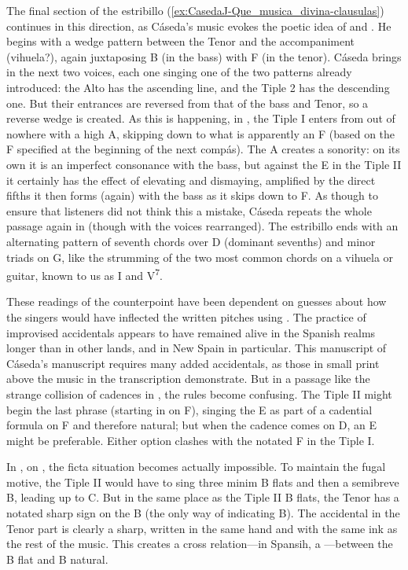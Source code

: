 The final section of the estribillo (\cref{ex:CasedaJ-Que_musica_divina-clausulas}) continues in this direction, as Cáseda's music evokes the poetic idea of  and .
He begins with a wedge pattern between the Tenor and the accompaniment (vihuela?), again juxtaposing B\fl{} (in the bass) with F\sh{} (in the tenor).
Cáseda brings in the next two voices, each one singing one of the two patterns already introduced: the Alto has the ascending line, and the Tiple 2 has the descending one.
But their entrances are reversed from that of the bass and Tenor, so a reverse wedge is created.
As this is happening, in , the Tiple I enters from out of nowhere with a high A, skipping down to what is apparently an F\na{} (based on the F\sh{} specified at the beginning of the next compás).
The A creates a  sonority: on its own it is an imperfect consonance with the bass, but against the E\fl{} in the Tiple II it certainly has the effect of elevating and dismaying, amplified by the direct fifths it then forms (again) with the bass as it skips down to F.
As though to ensure that listeners did not think this a mistake, Cáseda repeats the whole passage again in  (though with the voices rearranged).
The estribillo ends with an alternating pattern of seventh chords over D (dominant sevenths) and minor triads on G, like the strumming of the two most common chords on a vihuela or guitar, known to us as I and V\textsuperscript{7}.

These readings of the counterpoint have been dependent on guesses about how the singers would have inflected the written pitches using .
The practice of improvised accidentals appears to have remained alive in the Spanish realms longer than in other lands, and in New Spain in particular. 
This manuscript of Cáseda's manuscript requires many added accidentals, as those in small print above the music in the transcription demonstrate.
But in a passage like the strange collision of cadences in , the rules become confusing.
The Tiple II might begin the last phrase (starting in  on F), singing the E as part of a cadential formula on F and therefore natural; but when the cadence comes on D, an E\fl{} might be preferable. 
Either option clashes with the notated F\sh{} in the Tiple I.

In , on , the ficta situation becomes actually impossible.
To maintain the fugal motive, the Tiple II would have to sing three minim B flats and then a semibreve B\na, leading up to C.
But in the same place as the Tiple II B flats, the Tenor has a notated sharp sign on the B (the only way of indicating B\na).
The accidental in the Tenor part is clearly a sharp, written in the same hand  and with the same ink as the rest of the music.
This creates a cross relation---in Spansih, a ---between the B flat and B natural.

